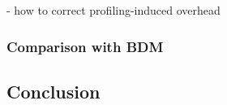 \documentclass[a4paper,12pt,oneside]{report}
\begin{document}
	- how to correct profiling-induced overhead

\section{Comparison with BDM}


\chapter*{Conclusion} 


\nocite{*} %

\clearpage %




\appendix %
\clearpage %

\part*{\appendixname}
\end{document}
